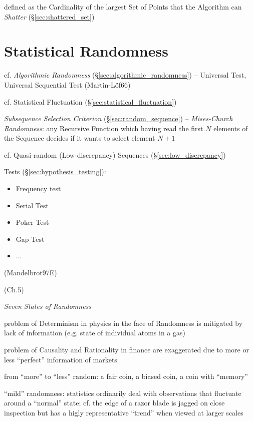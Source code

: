defined as the Cardinality of the largest Set of Points that the Algorithm can
\emph{Shatter} (\S\ref{sec:shattered_set})



\section{Statistical Randomness}\label{sec:statistical_randomness}

cf. \emph{Algorithmic Randomness} (\S\ref{sec:algorithmic_randomness}) --
Universal Test, Universal Sequential Test (Martin-L\"of66)

cf. Statistical Fluctuation (\S\ref{sec:statistical_fluctuation})

\emph{Subsequence Selection Criterion} (\S\ref{sec:random_sequence}) --
\emph{Mises-Church Randomness}: any Recursive Function which having read the
first $N$ elements of the Sequence decides if it wants to select element $N+1$

cf. Quasi-random (Low-discrepancy) Sequences (\S\ref{sec:low_discrepancy})

Tests (\S\ref{sec:hypothesis_testing}):
\begin{itemize}
  \item Frequency test
  \item Serial Test
  \item Poker Test
  \item Gap Test
  \item ...
\end{itemize}

(Mandelbrot97E)

(Ch.5)

\emph{Seven States of Randomness}

problem of Determinism in physics in the face of Randomness is mitigated by lack
of information (e.g. state of individual atoms in a gas)

problem of Causality and Rationality in finance are exaggerated due to more or
less ``perfect'' information of markets

from ``more'' to ``less'' random: a fair coin, a biased coin, a coin with
``memory''

``mild'' randomness: statistics ordinarily deal with observations that fluctuate
around a ``normal'' state; cf. the edge of a razor blade is jagged on close
inspection but has a higly representative ``trend'' when viewed at larger scales


